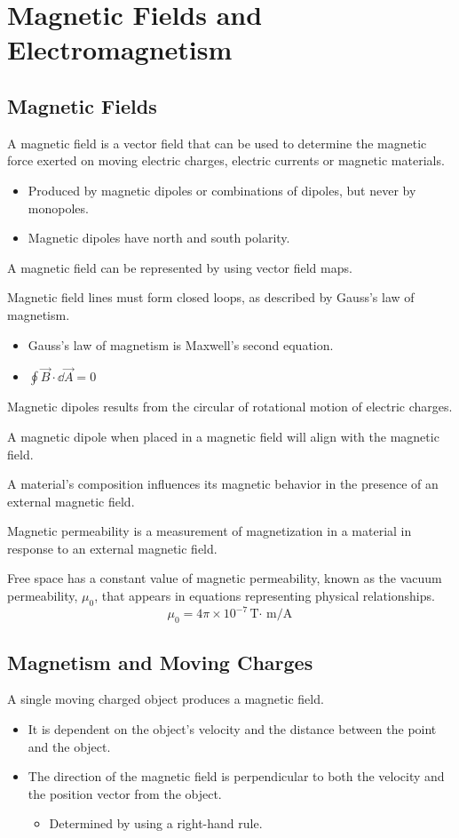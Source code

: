 \documentclass[../em.tex]{subfiles}
\begin{document}
\chapter{Magnetic Fields and Electromagnetism}
\section{Magnetic Fields}
A magnetic field is a vector field that can be used to determine the magnetic force exerted 
on moving electric charges, electric currents or magnetic materials.
\begin{itemize}
    \item Produced by magnetic dipoles or combinations of dipoles, but never by monopoles.
    \item Magnetic dipoles have north and south polarity.
\end{itemize}

A magnetic field can be represented by using vector field maps.

Magnetic field lines must form closed loops, as described by Gauss's law of magnetism.
\begin{itemize}
    \item Gauss's law of magnetism is Maxwell's second equation.
    \item $\oint \vec{B} \cdot \dd\vec{A} = 0$
\end{itemize}

Magnetic dipoles results from the circular of rotational motion of electric charges.

A magnetic dipole when placed in a magnetic field will align with the magnetic field.

A material's composition influences its magnetic behavior in the presence of an external magnetic field.

Magnetic permeability is a measurement of magnetization in a material in response to an external magnetic field.

Free space has a constant value of magnetic permeability, known as the vacuum permeability, $\mu_0$, that appears in equations representing physical relationships.
\[ \mu_0 = 4\pi \times 10^{-7} \text{T$\cdot$ m/A} \]
\section{Magnetism and Moving Charges}
A single moving charged object produces a magnetic field.
\begin{itemize}
    \item It is dependent on the object's velocity and the distance between the point and the object.
    \item The direction of the magnetic field is perpendicular to both the velocity and the position vector from the object. 
    \begin{itemize}
        \item Determined by using a right-hand rule.
    \end{itemize}
\end{itemize}
\end{document}
